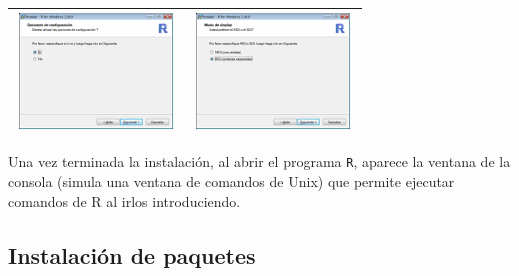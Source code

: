 \documentclass[]{book}
\begin{document}
\begin{longtable}[]{@{}cc@{}}
\includegraphics[width=0.95\textwidth,height=\textheight]{figuras/image5.png} & \includegraphics[width=0.95\textwidth,height=\textheight]{figuras/image6.png}\tabularnewline
\bottomrule
\end{longtable}

Una vez terminada la instalación, al abrir el programa \texttt{R}, aparece la
ventana de la consola (simula una ventana de comandos de Unix) que permite
ejecutar comandos de R al irlos introduciendo.

\hypertarget{instalacion-de-paquetes}{%
\subsection{Instalación de paquetes}\label{instalacion-de-paquetes}}
\end{document}

